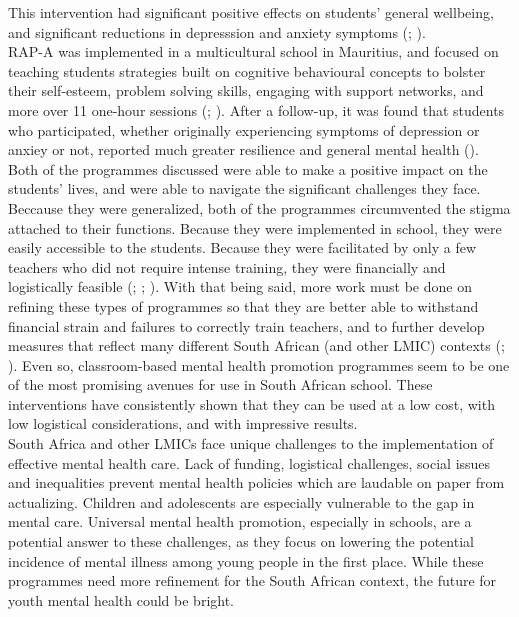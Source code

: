 \documentclass[stu,a4paper,12pt]{apa7}
\begin{document}
This intervention had significant positive effects on students' general
wellbeing, and significant reductions in depresssion and anxiety symptoms
(\cite{Osetal20b}; \cite{Oseral21}). \\
RAP-A was implemented in a multicultural school in Mauritius, and focused on
teaching students strategies built on cognitive behavioural concepts to bolster
their self-esteem, problem solving skills, engaging with support networks, and
more over 11 one-hour sessions (\cite{barryetal13}; \cite{riduvetal11}). After a
follow-up, it was found that students who participated, whether originally
experiencing symptoms of depression or anxiey or not, reported much greater
resilience and general mental health (\cite{riduvetal11}). \\
Both of the programmes discussed were able to make a positive impact on the
students' lives, and were able to navigate the significant challenges they face.
Beccause they were generalized, both of the programmes circumvented the stigma
attached to their functions. Because they were implemented in school, they were
easily accessible to the students. Because they were facilitated by only a few
teachers who did not require intense training, they were financially and
logistically feasible (\cite{Osetal20b}; \cite{Oseral21}; \cite{riduvetal11}).
With that being said, more work must be done on refining these types of
programmes so that they are better able to withstand financial strain and
failures to correctly train teachers, and to further develop measures that
reflect many different South African (and other LMIC) contexts
(\cite{barryetal13}; \cite{oretal18}). Even so, classroom-based mental health
promotion programmes seem to be one of the most promising avenues for use in
South African school. These interventions have consistently shown that they can
be used at a low cost, with low logistical considerations, and with impressive
results. \\
South Africa and other LMICs face unique challenges to the implementation of
effective mental health care. Lack of funding, logistical challenges, social
issues and inequalities prevent mental health policies which are laudable on
paper from actualizing. Children and adolescents are especially vulnerable to
the gap in mental care. Universal mental health promotion, especially in
schools, are a potential answer to these challenges, as they focus on lowering
the potential incidence of mental illness among young people in the first place.
While these programmes need more refinement for the South African context, the
future for youth mental health could be bright.
   \newpage
   \printbibliography
\end{document}
